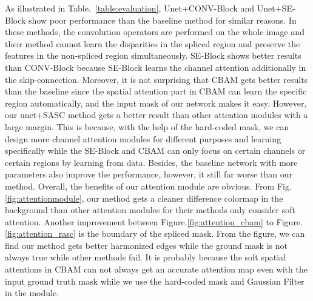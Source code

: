 As illustrated in Table.~\ref{table:evaluation}, Unet+CONV-Block and Unet+SE-Block show poor performance than the baseline method for similar reasons. In these methods, the convolution operators are performed on the whole image and their method cannot learn the disparities in the spliced region and preserve the features in the non-spliced region simultaneously. SE-Block shows better results than CONV-Block because SE-Block learns the channel attention additionally in the skip-connection.
Moreover, it is not surprising that CBAM gets better results than the baseline since the spatial attention part in CBAM can learn the specific region automatically, and the input mask of our network makes it easy.
However, our unet+SASC method gets a better result than other attention modules with a large margin. This is because, with the help of the hard-coded mask, we can design more channel attention modules for different purposes and learning specifically while the SE-Block and CBAM can only focus on certain channels or certain regions by learning from data. Besides, the baseline network with more parameters also improve the performance, however, it still far worse than our method. Overall, the benefits of our attention module are obvious. From Fig.\ref{fig:attentionmodule}, our method gets a cleaner difference colormap in the background than other attention modules for their methods only consider  soft attention. Another improvement between Figure.\ref{fig:attention_cbam} to Figure.\ref{fig:attention_rasc} is the boundary of the spliced mask. From the figure, we can find our method gets better harmonized edges while the ground mask is not always true while other methods fail. It is probably because the soft spatial attentions in CBAM can not always get an accurate attention map even with the input ground truth mask while we use the hard-coded mask and Gaussian Filter in the module. 





